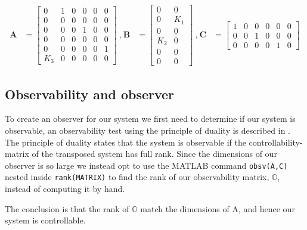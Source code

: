 \begin{equation}\label{eq:obsSysMtr}
    \begin{aligned}
        \mathbf{A} &=
        \begin{bmatrix}
            0 & 1 & 0 & 0 & 0 & 0 \\
            0 & 0 & 0 & 0 & 0 & 0 \\
            0 & 0 & 0 & 1 & 0 & 0 \\
            0 & 0 & 0 & 0 & 0 & 0 \\
            0 & 0 & 0 & 0 & 0 & 1 \\
            K_3 & 0 & 0 & 0 & 0 & 0 
        \end{bmatrix}
        \: \textrm{,} \:
        \mathbf{B} &=
        \begin{bmatrix}
            0 & 0 \\
            0 & K_1 \\
            0 & 0 \\
            K_2 & 0 \\
            0 & 0 \\
            0 & 0 
        \end{bmatrix}
        \: \textrm{,} \:
        \mathbf{C} &=
        \begin{bmatrix}
            1 & 0 & 0 & 0 & 0 & 0\\
            0 & 0 & 1 & 0 & 0 & 0\\
            0 & 0 & 0 & 0 & 1 & 0
        \end{bmatrix}
    \end{aligned}
\end{equation}


\subsection{Observability and observer}
To create an observer for our system we first need to determine if our system is observable, an observability test using the principle of duality is described in \cite{Chen2014}. The principle of duality states that the system is observable if the controllability-matrix of the transposed system has full rank. Since the dimensions of our observer is so large we instead opt to use the MATLAB command \texttt{obsv(A,C)} nested inside \texttt{rank(MATRIX)} to find the rank of our observability matrix, $\mathbb{O}$, instead of computing it by hand. 

The conclusion is that the rank of $\mathbb{O}$ match the dimensions of A, and hence our system is controllable.



